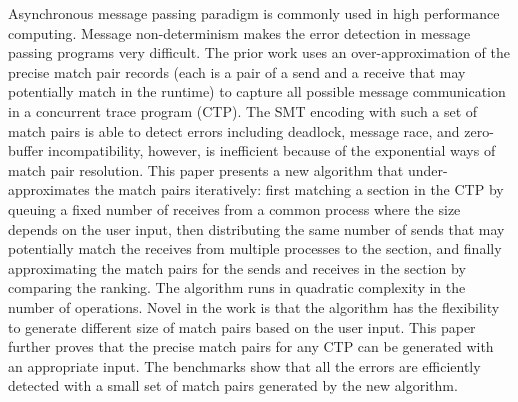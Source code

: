 Asynchronous message passing paradigm is commonly used in high performance computing.
Message non-determinism makes the error detection in message passing programs very difficult. The prior work uses an over-approximation of the precise match pair records (each is a pair of a send and a receive that may potentially match in the runtime) to capture all possible message communication in a concurrent trace program (CTP). The SMT encoding with such a set of match pairs is able to detect errors including deadlock, message race, and zero-buffer incompatibility, however, is inefficient because of the exponential ways of match pair resolution.
This paper presents a new algorithm that under-approximates the match pairs iteratively: first matching a section in the CTP by queuing a fixed number of receives from a common process where the size depends on the user input, then distributing the same number of sends that may potentially match the receives from multiple processes to the section, and finally approximating the match pairs for the sends and receives in the section by comparing the ranking. The algorithm runs in quadratic complexity in the number of operations. Novel in the work is that the algorithm has the flexibility to generate different size of match pairs based on the user input. This paper further proves that the precise match pairs for any CTP can be generated with an appropriate input. The benchmarks show that all the errors are efficiently detected with a small set of match pairs generated by the new algorithm.